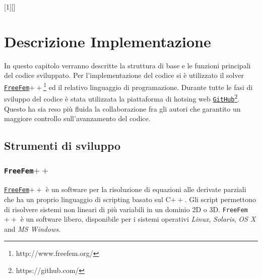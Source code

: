 [1][]{}{}

\section{Descrizione Implementazione}
\label{chap:Code}

In questo capitolo verranno descritte la struttura di base e le funzioni principali del codice sviluppato.
Per l'implementazione del codice si è utilizzato il solver \href{http://www.freefem.org/}\texttt{FreeFem$++$}\footnote{http://www.freefem.org/} ed il relativo linguaggio di programazione. Durante tutte le fasi di sviluppo del codice è stata utilizzata la piattaforma di hotsing web \href{https://github.com/}{\texttt{GitHub}}\footnote{https://github.com/}. Questo ha sia reso più fluida la collaborazione fra gli autori che garantito un maggiore controllo sull'avanzamento del codice.

\subsection{Strumenti di sviluppo}
\subsubsection{\texttt{FreeFem$++$}}
\href{http://www.freefem.org/}\texttt{FreeFem$++$} è un software per la risoluzione di equazioni alle derivate parziali che ha un proprio linguaggio di scripting basato sul C$++$. Gli script permettono di risolvere sistemi non lineari di più variabili in un dominio 2D o 3D.
\texttt{FreeFem$++$} è un software libero, disponibile per i sistemi operativi \textit{Linux}, \textit{Solaris}, \textit{OS X} and \textit{MS Windows}.

